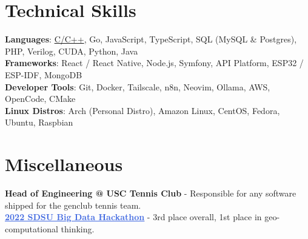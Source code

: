 \documentclass[letterpaper,11pt]{article}
\newcommand{\resumeLink}[2]{\href{#1}{\textcolor{RoyalBlue}{\ul{#2}}}}
\begin{document}
\section{Technical Skills}
 \begin{itemize}[label={}]
    \small{\item{
        \textbf{Languages}{: \ul{C/C++}, Go, JavaScript, TypeScript, SQL (MySQL \& Postgres), PHP, Verilog, CUDA, Python, Java} \\
      \textbf{Frameworks}{: React / React Native, Node.js, Symfony, API Platform, ESP32 / ESP-IDF, MongoDB} \\
      \textbf{Developer Tools}{: Git, Docker, Tailscale, n8n, Neovim, Ollama, AWS, OpenCode, CMake} \\
      \textbf{Linux Distros}{: Arch (Personal Distro), Amazon Linux, CentOS, Fedora, Ubuntu, Raspbian} \\
    }}
 \end{itemize}

\section{Miscellaneous}
 \begin{itemize}[label={}]
    \small{\item{
	\textbf{Head of Engineering @ USC Tennis Club} - Responsible for any software shipped for the genclub tennis team.\\
		 \resumeLink{https://bigdataforsandiego.github.io/bigdataforsandiego2022.github.io/\#winner}{\textbf{2022 SDSU Big Data Hackathon}} - 3rd place overall, 1st place in geo-computational thinking.} }
 \end{itemize}
\end{document}

